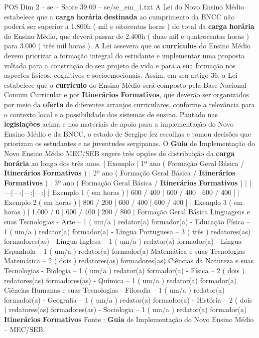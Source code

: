\begin{textsample}{POS Dim 2 – se – Score 39.00 – se/se\_em\_1.txt}
A Lei do Novo Ensino Médio estabelece que a \textbf{carga} \textbf{horária} \textbf{destinada} ao cumprimento da BNCC não poderá ser superior a 1.800h ( mil e oitocentas horas ) do total da \textbf{carga} \textbf{horária} do Ensino Médio, que deverá passar de 2.400h ( duas mil e quatrocentas horas ) para 3.000 ( três mil horas ).
A Lei assevera que os \textbf{currículos} do Ensino Médio devem priorizar a formação integral do estudante e implementar uma proposta voltada para a construção do seu projeto de vida e para a sua formação nos aspectos físicos, cognitivos e socioemocionais.
Assim, em seu artigo 36, a Lei estabelece que o \textbf{currículo} do Ensino Médio será composto pela Base Nacional Comum Curricular e por \textbf{Itinerários} \textbf{Formativos}, que deverão ser organizados por meio da \textbf{oferta} de diferentes arranjos curriculares, conforme a relevância para o contexto local e a possibilidade dos sistemas de ensino.
Pautado nas \textbf{legislações} acima e nos materiais de apoio para a implementação do Novo Ensino Médio e da BNCC, o estado de Sergipe fez escolhas e tomou decisões que priorizam os estudantes e as juventudes sergipanas.
O \textbf{Guia} de Implementação do Novo Ensino Médio MEC/SEB sugere três opções de distribuição da \textbf{carga} \textbf{horária} ao longo dos três anos. | Exemplo | 1º ano ( Formação Geral Básica / \textbf{Itinerários} \textbf{Formativos} ) | 2º ano ( Formação Geral Básica / \textbf{Itinerários} \textbf{Formativos} ) | 3º ano ( Formação Geral Básica / \textbf{Itinerários} \textbf{Formativos} ) | |---|---:|---:|---:| | Exemplo 1 ( em horas ) | 600 / 400 | 600 / 400 | 600 / 400 | | Exemplo 2 ( em horas ) | 800 / 200 | 600 / 400 | 600 / 400 | | Exemplo 3 ( em horas ) | 1.000 / 0 | 600 / 400 | 200 / 800 | Formação Geral Básica Linguagens e suas Tecnologias - Arte – 1 ( um/a ) redator(a) formador(a) - Educação Física – 1 ( um/a ) redator(a) formador(a) - Língua Portuguesa – 3 ( três ) redatores(as) formadores(as) - Língua Inglesa – 1 ( um/a ) redator(a) formador(a) - Língua Espanhola – 1 ( um/a ) redator(a) formador(a) Matemática e suas Tecnologias - Matemática – 2 ( dois ) redatores(as) formadores(as) Ciências da Natureza e suas Tecnologias - Biologia – 1 ( um/a ) redator(a) formador(a) - Física – 2 ( dois ) redatores(as) formadores(as) - Química – 1 ( um/a ) redator(a) formador(a) Ciências Humanas e suas Tecnologias - Filosofia – 1 ( um/a ) redator(a) formador(a) - Geografia – 1 ( um/a ) redator(a) formador(a) - História – 2 ( dois ) redatores(as) formadores(as) - Sociologia – 1 ( um/a ) redator(a) formador(a) \textbf{Itinerários} \textbf{Formativos} Fonte : \textbf{Guia} de Implementação do Novo Ensino Médio – MEC/SEB.

\end{textsample}
